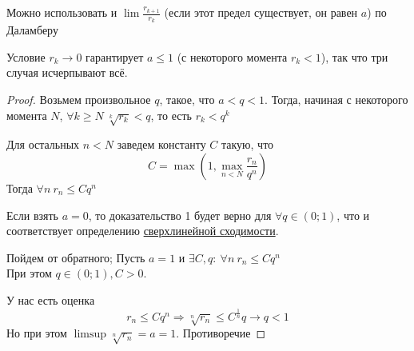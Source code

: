 

\begin{remark}
  Можно использовать и $\lim \frac{r_{k+1}}{r_k}$ (если этот предел существует, он равен $a$) по Даламберу
\end{remark}

\begin{remark}
  Условие $r_k \to 0$ гарантирует $a \le 1$ (с некоторого момента $r_k < 1$), так что три случая исчерпывают всё.
\end{remark}

\begin{proof}
  Возьмем произвольное $q$, такое, что $a < q < 1$.
  Тогда, начиная с некоторого момента $N$, $\forall k \ge N\ \sqrt[k]{r_k} < q$, то есть $r_k < q^k$

  Для остальных $n < N$ заведем константу $C$ такую, что
  \[
  C = \max \left( 1, \max_{n < N} \frac{r_n}{q^n} \right)
  \]
  Тогда $\forall n\  r_n \le Cq^n$

  Если взять $a = 0$, то доказательство 1 будет верно для $\forall q \in (0;1)$, что и соответствует
  определению \hyperref[note:9FA20DA5-3A95-4683-9CB5-C6C9A903C86A]{сверхлинейной сходимости}.

  Пойдем от обратного; Пусть $a = 1$ и $\exists C, q:\  \forall n\ r_n \le Cq^n$ \\
  При этом $q \in (0;1), C>0$.

  У нас есть оценка
  \[
  r_n \le C q^n \Rightarrow \sqrt[n]{r_n} \le C^{\frac{1}{n}} q \rightarrow q < 1
  \]
  Но при этом $\limsup \sqrt[n]{r_n} = a = 1$.
  Противоречие
\end{proof}
